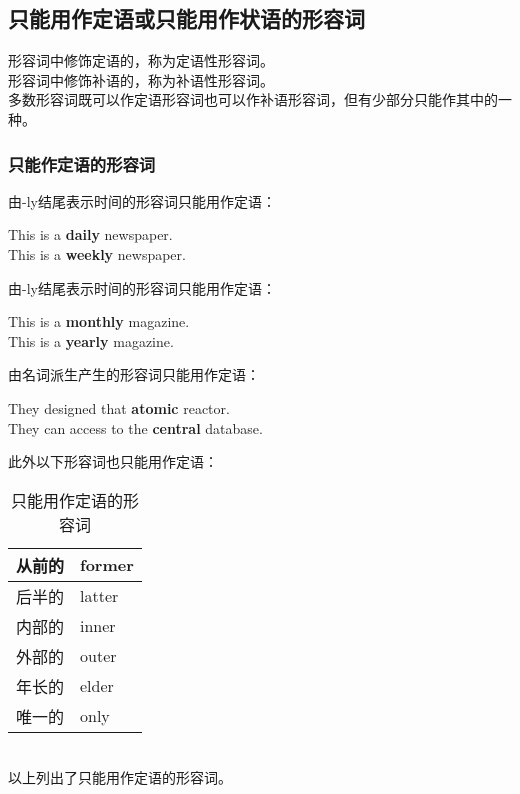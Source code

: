 \documentclass[UTF8]{ctexart}
\newcommand{\littf}[1]{{\hspace{3pt}\ttfamily #1}}
\begin{document}
\subsection{只能用作定语或只能用作状语的形容词}
    形容词中修饰定语的，称为定语性形容词。\\[3mm]
    形容词中修饰补语的，称为补语性形容词。\\[3mm]
    多数形容词既可以作定语形容词也可以作补语形容词，但有少部分只能作其中的一种。

\newpage

\subsubsection{只能作定语的形容词}
    由\littf{-ly}结尾表示时间的形容词只能用作定语：
    \begin{center}
        \large\ttfamily
        This is a \textbf{daily} newspaper.\\[3mm]
        This is a \textbf{weekly} newspaper.\\[6mm]
    \end{center}
    由\littf{-ly}结尾表示时间的形容词只能用作定语：
    \begin{center}
        \large\ttfamily
        This is a \textbf{monthly} magazine.\\[3mm]
        This is a \textbf{yearly} magazine.\\[6mm]
    \end{center}
    由名词派生产生的形容词只能用作定语：
    \begin{center}
        \large\ttfamily
        They designed that \textbf{atomic} reactor.\\[3mm]
        They can access to the \textbf{central} database.\\[6mm]
    \end{center}
    此外以下形容词也只能用作定语：
    \begin{table}[h]
        \begin{center}
            \ttfamily
            \begin{tabular}{p{80pt}|p{100pt}}
                \hline
                从前的&former\\ \hline
                后半的&latter\\ \hline
                内部的&inner\\ \hline
                外部的&outer\\ \hline
                年长的&elder\\ \hline
                唯一的&only\\ \hline
            \end{tabular}
            \rmfamily
            \caption{只能用作定语的形容词}
        \end{center}
    \end{table}\\
    以上列出了只能用作定语的形容词。
\end{document}
